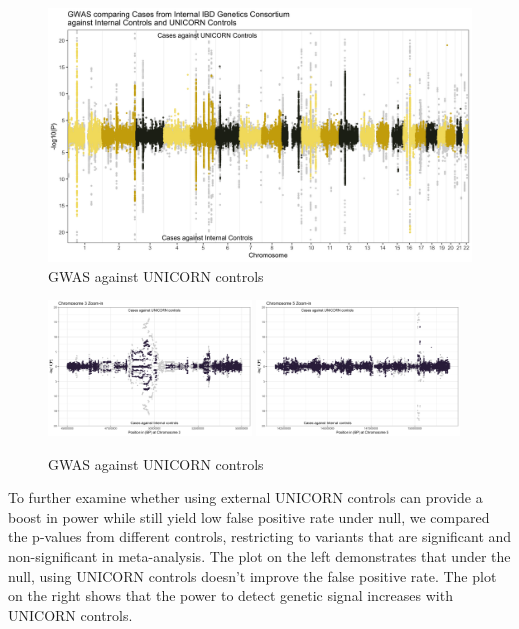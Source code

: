 \documentclass[12pt]{amsart}
\begin{document}
\begin{figure}[H]
    \centering
    \includegraphics[width=\textwidth]{qc/manhattan.png}
    \caption{GWAS against UNICORN controls}
    \label{fig:gwas}
\end{figure}
\begin{figure}[H]
    \includegraphics[width=0.48\textwidth]{qc/manhattan_zoom_in1.png}
    \includegraphics[width=0.48\textwidth]{qc/manhattan_zoom_in2.png}
    \caption{GWAS against UNICORN controls}
    \label{fig:gwas}
\end{figure}

To further examine whether using external UNICORN controls can provide a boost in power while still yield low false positive rate under null, we compared the p-values from different controls, restricting to variants that are significant and non-significant in meta-analysis. The plot on the left demonstrates that under the null, using UNICORN controls doesn't improve the false positive rate. The plot on the right shows that the power to detect genetic signal increases with UNICORN controls.
\end{document}
